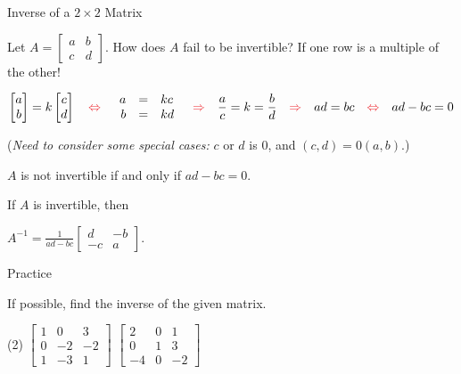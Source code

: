 \documentclass[xcolor=dvipsnames,aspectratio=169,t]{beamer}
\begin{document}
\begin{frame}{Inverse of a $2\times 2$ Matrix}
  \smallskip
  
  Let $A=\begin{bmatrix} a & b \\ c & d\end{bmatrix}$.  How does $A$ \alert{fail} to be invertible?
  \pause If one row is a multiple of the other!
  
  \[
    \begin{bmatrix} a \\ b \end{bmatrix} = k \begin{bmatrix} c \\ d \end{bmatrix}
    \quad \colorr{\Leftrightarrow} \quad
    \begin{array}{rcl}
      a &=& kc \\
      b &=& kd
    \end{array}
    \quad \colorr{\Rightarrow} \quad
    \frac{a}{c} = k = \frac{b}{d}
    \quad \colorr{\Rightarrow} \quad
    ad=bc
    \quad \colorr{\Leftrightarrow} \quad
    ad-bc=0
  \]
  
  \pause
  (\emph{Need to consider some special cases:} $c$ or $d$ is $0$, and $(c,d)=0(a,b)$.)
  
  \pause
  \begin{theorem}
    $A$ is \alert{not invertible} if and only if $ad-bc=0$.
  \end{theorem}
  
  \vspace*{1em}
  
  \pause
  If $A$ is \alert{invertible}, then
  \smallskip
  
  $A^{-1}=\displaystyle\frac{1}{ad-bc} \begin{bmatrix} d & -b \\ -c & a \end{bmatrix}$.  %
 
\end{frame}



\begin{frame}{Practice}

  If possible, find the inverse of the given matrix.

  \begin{tasks}(2)
    \task $\begin{bmatrix} 1 & 0 & 3 \\ 0 & -2 & -2\\ 1 & -3 & 1 \end{bmatrix}$
    \task $\begin{bmatrix} 2 & 0 & 1\\  0 & 1 & 3\\ -4 & 0 & -2 \end{bmatrix}$
  \end{tasks}

\end{frame}
\end{document}
